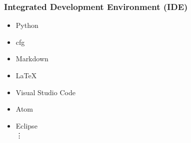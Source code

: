 \documentclass[aspectratio=169]{beamer}
\begin{document}
\begin{frame}
  \frametitle{Integrated Development Environment (IDE)}
  \summary{}

  \begin{itemize}
    \begin{itemize}
    \item {\ttfamily Python}
    \item {\ttfamily cfg}
    \item {\ttfamily Markdown}
    \item {\ttfamily LaTeX}
    \end{itemize}
    \begin{itemize}
    \item Visual Studio Code
    \item Atom
    \item Eclipse\\
      \noindent\vdots
    \end{itemize}
  \end{itemize}
  
\end{frame}
\end{document}
